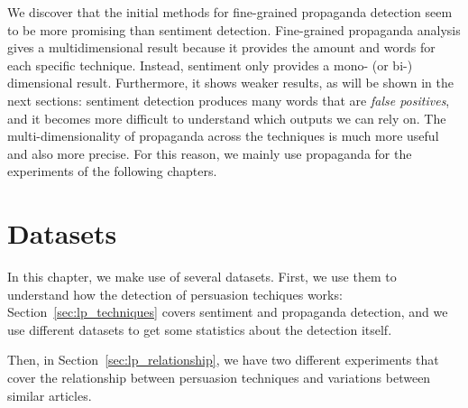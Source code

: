 We discover that
the initial methods for fine-grained propaganda detection seem to be more promising %
than sentiment detection.
Fine-grained propaganda analysis gives a multidimensional result because it provides the amount and words for each specific technique. Instead, sentiment only provides a mono- (or bi-) dimensional result. Furthermore, it shows weaker results, as will be shown in the next sections: sentiment detection produces many words that are \emph{false positives}, and it becomes more difficult to understand which outputs we can rely on.
The multi-dimensionality of propaganda across the techniques is much more useful and also more precise.
For this reason, we mainly use propaganda for the experiments of the following chapters. 


\section{Datasets}
\label{sec:lp_datasets}

In this chapter, we make use of several datasets. 
First, we use them to understand how the detection of persuasion techiques works: Section~\ref{sec:lp_techniques} covers sentiment and propaganda detection, and we use different datasets to get some statistics about the detection itself.

Then, in Section~\ref{sec:lp_relationship}, we have two different experiments that cover the relationship between persuasion techniques and variations between similar articles.

